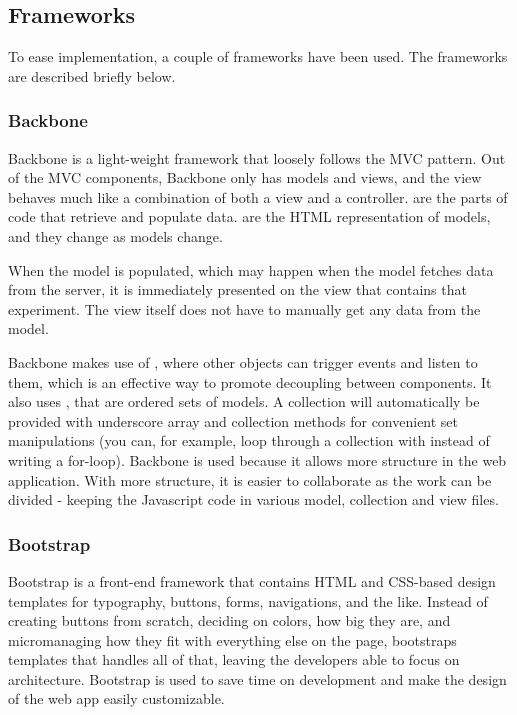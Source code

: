 

\subsection{Frameworks}
\label{sec:web_frame}
To ease implementation, a couple of frameworks have been used. The frameworks are described briefly below.
\subsubsection{Backbone}
Backbone\cite{web_1} is a light-weight framework that loosely follows the MVC pattern. Out of the MVC components, Backbone only has models and views, and the view behaves much like a combination of both a view and a controller.  are the parts of code that retrieve and populate data.  are the HTML representation of models, and they change as models change.

\begin{example}
When the  model is populated, which may happen when the model fetches data from the server, it is immediately presented on the view that contains that experiment. The view itself does not have to manually get any data from the  model.
\end{example}

Backbone makes use of , where other objects can trigger events and listen to them, which is an effective way to promote decoupling between components. It also uses , that are ordered sets of models. A collection will automatically be provided with underscore array and collection methods for convenient set manipulations (you can, for example, loop through a collection with  instead of writing a for-loop). Backbone is used because it allows more structure in the web application. With more structure, it is easier to collaborate as the work can be divided - keeping the Javascript code in various model, collection and view files.

\subsubsection{Bootstrap}
Bootstrap\cite{web_2} is a front-end framework that contains HTML and CSS-based design templates for typography, buttons, forms, navigations, and the like. Instead of creating buttons from scratch, deciding on colors, how big they are, and micromanaging how they fit with everything else on the page, bootstraps templates that handles all of that, leaving the developers able to focus on architecture. Bootstrap is used to save time on development and make the design of the web app easily customizable.

